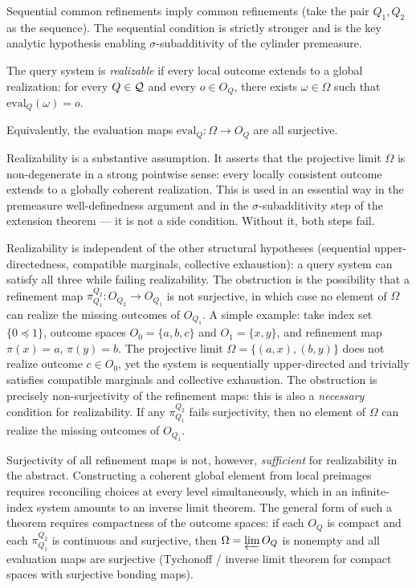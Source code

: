 Sequential common refinements imply common refinements (take the pair $Q_1,Q_2$ as
the sequence).  The sequential condition is strictly stronger and is the key analytic
hypothesis enabling $\sigma$-subadditivity of the cylinder premeasure.

\begin{definition}[Realizability]
\label{def:eval-surjective}
The query system is \emph{realizable} if every local outcome extends to a global
realization: for every $Q\in\mathcal{Q}$ and every $o\in O_Q$, there exists
$\omega\in\Omega$ such that $\mathrm{eval}_Q(\omega)=o$.

Equivalently, the evaluation maps $\mathrm{eval}_Q:\Omega\to O_Q$ are all surjective.
\end{definition}

\begin{remark}
Realizability is a substantive assumption. It asserts that the
projective limit $\Omega$ is non-degenerate in a strong pointwise
sense: every locally consistent outcome extends to a globally coherent
realization. This is used in an essential way in the premeasure
well-definedness argument and in the $\sigma$-subadditivity step of
the extension theorem --- it is not a side condition. Without it,
both steps fail.

Realizability is independent of the other structural hypotheses
(sequential upper-directedness, compatible marginals, collective exhaustion):
a query system can satisfy all three while failing realizability.
The obstruction is the possibility that a refinement map
$\pi^{Q_2}_{Q_1} : O_{Q_2} \to O_{Q_1}$ is not surjective, in which case
no element of $\Omega$ can realize the missing outcomes of $O_{Q_1}$.
A simple example: take index set $\{0 \preceq 1\}$, outcome spaces $O_0 = \{a,b,c\}$
and $O_1 = \{x,y\}$, and refinement map $\pi(x) = a$, $\pi(y) = b$.
The projective limit $\Omega = \{(a,x),(b,y)\}$ does not realize outcome $c \in O_0$,
yet the system is sequentially upper-directed and trivially satisfies
compatible marginals and collective exhaustion.
The obstruction is precisely non-surjectivity of the refinement maps: this is also
a \emph{necessary} condition for realizability.  If any $\pi^{Q_2}_{Q_1}$ fails
surjectivity, then no element of $\Omega$ can realize the missing outcomes of $O_{Q_1}$.

Surjectivity of all refinement maps is not, however, \emph{sufficient} for realizability
in the abstract.  Constructing a coherent global element from local preimages requires
reconciling choices at every level simultaneously, which in an infinite-index system
amounts to an inverse limit theorem.  The general form of such a theorem requires
compactness of the outcome spaces: if each $O_Q$ is compact and each
$\pi^{Q_2}_{Q_1}$ is continuous and surjective, then $\Omega = \varprojlim O_Q$ is
nonempty and all evaluation maps are surjective (Tychonoff / inverse limit theorem for
compact spaces with surjective bonding maps).


\end{remark}
